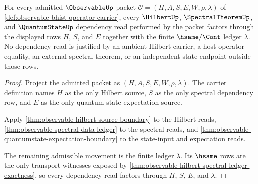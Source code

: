 \begin{theorem}
\label{thm:observable-dependency-namecert-exactness}
For every admitted $\ObservableUp$ packet
$\mathcal{O}=(H,A,S,E,W,\rho,\lambda)$ of
\autoref{def:observable-bhist-operator-carrier}, every
$\HilbertUp$, $\SpectralTheoremUp$, and $\QuantumStateUp$ dependency read
performed by the packet factors through the displayed rows $H$, $S$, and $E$
together with the finite $\hsame/\Cont$ ledger $\lambda$. No dependency read
is justified by an ambient Hilbert carrier, a host operator equality, an
external spectral theorem, or an independent state endpoint outside those
rows.
\end{theorem}
\begin{proof}
Project the admitted packet as $(H,A,S,E,W,\rho,\lambda)$. The carrier
definition names $H$ as the only Hilbert source, $S$ as the only spectral
dependency row, and $E$ as the only quantum-state expectation source.

Apply \autoref{thm:observable-hilbert-source-boundary} to the Hilbert reads,
\autoref{thm:observable-spectral-data-ledger} to the spectral reads, and
\autoref{thm:observable-quantumstate-expectation-boundary} to the state-input
and expectation reads.

The remaining admissible movement is the finite ledger $\lambda$. Its
$\hsame$ rows are the only transport witnesses exposed by
\autoref{thm:observable-hilbert-spectral-ledger-exactness}, so every dependency
read factors through $H$, $S$, $E$, and $\lambda$.
\end{proof}

